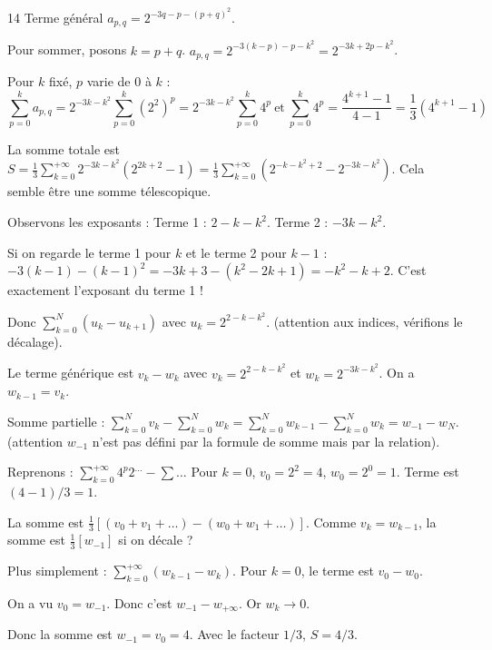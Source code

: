 \begin{correction}{14}
    Terme général $a_{p,q} = 2^{-3q-p-(p+q)^{2}}$.

    Pour sommer, posons $k=p+q$.
    $a_{p,q} = 2^{-3(k-p)-p-k^2} = 2^{-3k+2p-k^2}$.

    Pour $k$ fixé, $p$ varie de $0$ à $k$ :
    $$\sum_{p=0}^k a_{p,q} = 2^{-3k-k^2} \sum_{p=0}^k (2^2)^p = 2^{-3k-k^2} \sum_{p=0}^k 4^p ~\text{et}~
    \sum_{p=0}^k 4^p = \frac{4^{k+1}-1}{4-1} = \frac{1}{3}(4^{k+1}-1)$$

    La somme totale est $\displaystyle S = \frac{1}{3} \sum_{k=0}^{+\infty} 2^{-3k-k^2} \left(2^{2k+2}-1\right) = \frac{1}{3} \sum_{k=0}^{+\infty} \left(2^{-k-k^2+2} - 2^{-3k-k^2}\right)$.
    Cela semble être une somme télescopique.

    Observons les exposants :
    Terme 1 : $2 - k - k^2$.
    Terme 2 : $-3k - k^2$.

    Si on regarde le terme 1 pour $k$ et le terme 2 pour $k-1$ :
    $-3(k-1)-(k-1)^2 = -3k+3-(k^2-2k+1) = -k^2-k+2$.
    C'est exactement l'exposant du terme 1 !

    Donc $\sum_{k=0}^N (u_k - u_{k+1})$ avec $u_k = 2^{2-k-k^2}$. (attention aux indices, vérifions le décalage).

    Le terme générique est $v_k - w_k$ avec $v_k = 2^{2-k-k^2}$ et $w_k = 2^{-3k-k^2}$.
    On a $w_{k-1} = v_k$.

    Somme partielle : $\sum_{k=0}^N v_k - \sum_{k=0}^N w_k = \sum_{k=0}^N w_{k-1} - \sum_{k=0}^N w_k = w_{-1} - w_N$.
    (attention $w_{-1}$ n'est pas défini par la formule de somme mais par la relation).

    Reprenons :
    $\sum_{k=0}^{+\infty} 4^p 2^{\dots} - \sum \dots$
    Pour $k=0$, $v_0 = 2^2=4$, $w_0 = 2^0=1$. Terme est $(4-1)/3 = 1$.

    La somme est $\frac{1}{3} [ (v_0 + v_1 + \dots) - (w_0 + w_1 + \dots) ]$.
    Comme $v_k = w_{k-1}$, la somme est $\frac{1}{3} [ w_{-1} ]$ si on décale ?

    Plus simplement : $\sum_{k=0}^{+\infty} (w_{k-1} - w_k)$.
    Pour $k=0$, le terme est $v_0 - w_0$.

    On a vu $v_0 = w_{-1}$. Donc c'est $w_{-1} - w_{+\infty}$.
    Or $w_k \to 0$.

    Donc la somme est $w_{-1} = v_0 = 4$.
    Avec le facteur $1/3$, $S = 4/3$.
\end{correction}

